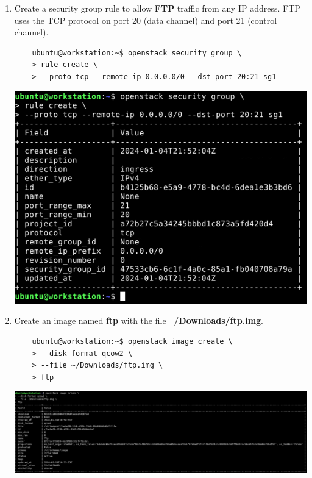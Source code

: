 \documentclass[letterpaper, 12pt]{article}
\begin{document}
\begin{enumerate}
    \item Create a security group rule to allow \textbf{FTP} traffic from any IP address. FTP uses the TCP protocol on
    port 20 (data channel) and port 21 (control channel).
    \begin{lstlisting}
    ubuntu@workstation:~$ openstack security group \
    > rule create \
    > --proto tcp --remote-ip 0.0.0.0/0 --dst-port 20:21 sg1
    \end{lstlisting}

    \begin{center}
        \includegraphics[width=\linewidth]{images/part1/step32.png}
    \end{center}

    \item Create an image named \textbf{ftp} with the file \textbf{~/Downloads/ftp.img}.
    \begin{lstlisting}
    ubuntu@workstation:~$ openstack image create \
    > --disk-format qcow2 \
    > --file ~/Downloads/ftp.img \
    > ftp
    \end{lstlisting}

    \begin{center}
        \includegraphics[width=\linewidth]{images/part1/step33.png}
    \end{center}


\end{enumerate}
\end{document}
